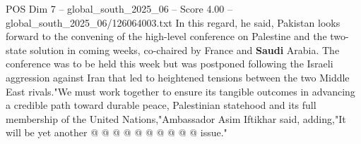 \begin{textsample}{POS Dim 7 – global\_south\_2025\_06 – Score 4.00 – global\_south\_2025\_06/126064003.txt}
In this regard, he said, Pakistan looks forward to the convening of the high-level conference on Palestine and the two-state solution in coming weeks, co-chaired by France and \textbf{Saudi} Arabia.
The conference was to be held this week but was postponed following the Israeli aggression against Iran that led to heightened tensions between the two Middle East rivals."We must work together to ensure its tangible outcomes in advancing a credible path toward durable peace, Palestinian statehood and its full membership of the United Nations,"Ambassador Asim Iftikhar said, adding,"It will be yet another @ @ @ @ @ @ @ @ @ @ issue."

\end{textsample}
